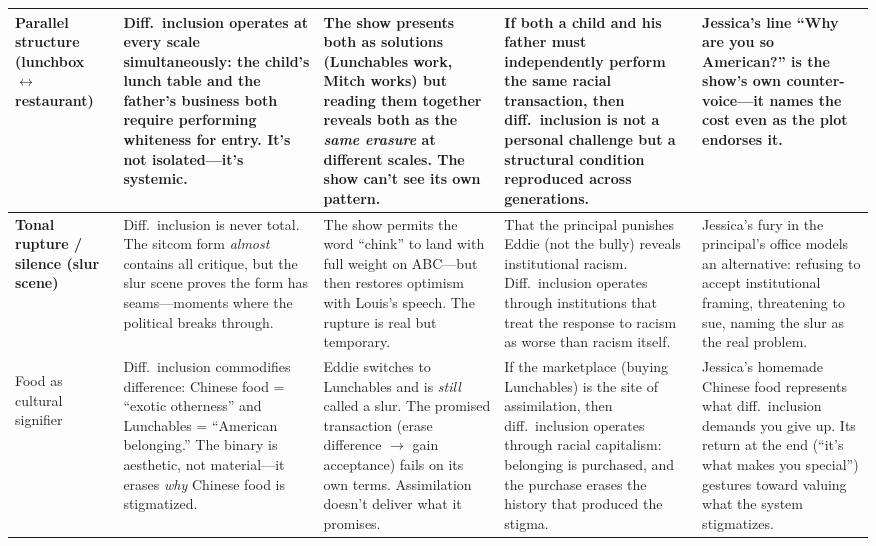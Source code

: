 \documentclass[12pt]{article}
\begin{document}
\begin{tabularx}{\textwidth}{|>{\raggedright\arraybackslash\bfseries}p{1.8cm}|X|X|X|X|}
Parallel structure (lunchbox $\leftrightarrow$ restaurant) &
Diff.\ inclusion operates at every scale simultaneously: the child's lunch table and the father's business both require performing whiteness for entry. It's not isolated---it's systemic. &
The show presents both as solutions (Lunchables work, Mitch works) but reading them together reveals both as the \textit{same erasure} at different scales. The show can't see its own pattern. &
If both a child and his father must independently perform the same racial transaction, then diff.\ inclusion is not a personal challenge but a structural condition reproduced across generations. &
Jessica's line ``Why are you so American?'' is the show's own counter-voice---it names the cost even as the plot endorses it. \\
\hline

Tonal rupture / silence (slur scene) &
Diff.\ inclusion is never total. The sitcom form \textit{almost} contains all critique, but the slur scene proves the form has seams---moments where the political breaks through. &
The show permits the word ``chink'' to land with full weight on ABC---but then restores optimism with Louis's speech. The rupture is real but temporary. &
That the principal punishes Eddie (not the bully) reveals institutional racism. Diff.\ inclusion operates through institutions that treat the response to racism as worse than racism itself. &
Jessica's fury in the principal's office models an alternative: refusing to accept institutional framing, threatening to sue, naming the slur as the real problem. \\
\hline

Food as cultural signifier &
Diff.\ inclusion commodifies difference: Chinese food = ``exotic otherness'' and Lunchables = ``American belonging.'' The binary is aesthetic, not material---it erases \textit{why} Chinese food is stigmatized. &
Eddie switches to Lunchables and is \textit{still} called a slur. The promised transaction (erase difference $\rightarrow$ gain acceptance) fails on its own terms. Assimilation doesn't deliver what it promises. &
If the marketplace (buying Lunchables) is the site of assimilation, then diff.\ inclusion operates through racial capitalism: belonging is purchased, and the purchase erases the history that produced the stigma. &
Jessica's homemade Chinese food represents what diff.\ inclusion demands you give up. Its return at the end (``it's what makes you special'') gestures toward valuing what the system stigmatizes. \\
\hline


\end{tabularx}
\end{document}
